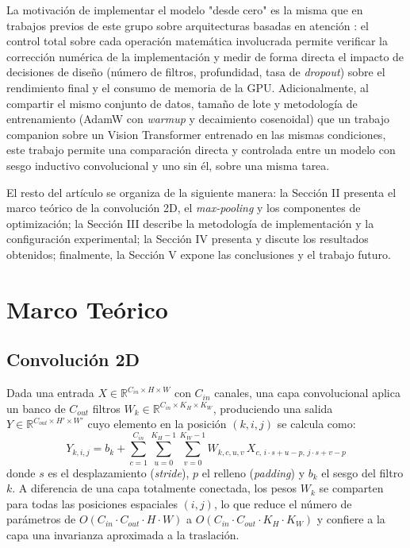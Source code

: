 \documentclass[conference]{IEEEtran}
\begin{document}
La motivación de implementar el modelo "desde cero" es la misma que en trabajos previos de este grupo sobre arquitecturas basadas en atención \cite{dosovitskiy2020image}: el control total sobre cada operación matemática involucrada permite verificar la corrección numérica de la implementación y medir de forma directa el impacto de decisiones de diseño (número de filtros, profundidad, tasa de \emph{dropout}) sobre el rendimiento final y el consumo de memoria de la GPU. Adicionalmente, al compartir el mismo conjunto de datos, tamaño de lote y metodología de entrenamiento (AdamW con \emph{warmup} y decaimiento cosenoidal) que un trabajo companion sobre un Vision Transformer entrenado en las mismas condiciones, este trabajo permite una comparación directa y controlada entre un modelo con sesgo inductivo convolucional y uno sin él, sobre una misma tarea.

El resto del artículo se organiza de la siguiente manera: la Sección II presenta el marco teórico de la convolución 2D, el \emph{max-pooling} y los componentes de optimización; la Sección III describe la metodología de implementación y la configuración experimental; la Sección IV presenta y discute los resultados obtenidos; finalmente, la Sección V expone las conclusiones y el trabajo futuro.


\section{Marco Teórico}

\subsection{Convolución 2D}
Dada una entrada $X \in \mathbb{R}^{C_{in} \times H \times W}$ con $C_{in}$ canales, una capa convolucional aplica un banco de $C_{out}$ filtros $W_k \in \mathbb{R}^{C_{in}\times K_H\times K_W}$, produciendo una salida $Y \in \mathbb{R}^{C_{out}\times H'\times W'}$ cuyo elemento en la posición $(k, i, j)$ se calcula como:
\begin{equation}
Y_{k,i,j} = b_k + \sum_{c=1}^{C_{in}}\sum_{u=0}^{K_H-1}\sum_{v=0}^{K_W-1} W_{k,c,u,v} \, X_{c,\, i\cdot s + u - p,\, j\cdot s + v - p}
\end{equation}
donde $s$ es el desplazamiento (\emph{stride}), $p$ el relleno (\emph{padding}) y $b_k$ el sesgo del filtro $k$. A diferencia de una capa totalmente conectada, los pesos $W_k$ se comparten para todas las posiciones espaciales $(i,j)$, lo que reduce el número de parámetros de $O(C_{in}\cdot C_{out}\cdot H\cdot W)$ a $O(C_{in}\cdot C_{out}\cdot K_H\cdot K_W)$ y confiere a la capa una invarianza aproximada a la traslación.
\end{document}
